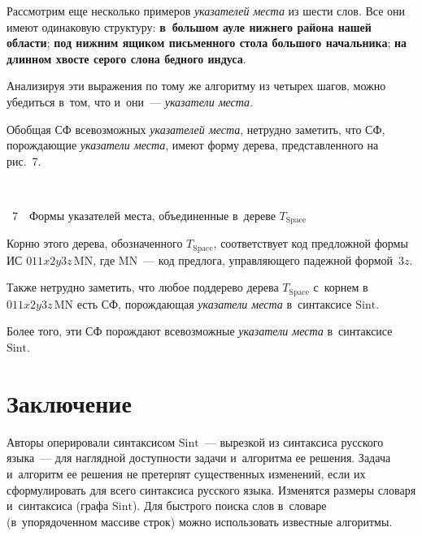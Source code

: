 \begin{multicols}{2}
     Рассмотрим еще несколько примеров \textit{указателей места} из шес\-ти 
слов. Все они имеют одинаковую структуру:
\textbf{в~большом ауле нижнего района нашей 
области}; \textbf{под нижним ящиком письменного стола
большого  начальника};
\textbf{на длинном хвосте серого слона бедного индуса}.

      

     
     Анализируя эти выражения по тому же алгоритму из четырех шагов, можно 
убедиться в~том, что и~они~--- \textit{указатели места}. 
     
     Обобщая СФ всевозможных \textit{указателей места}, нетрудно заметить, 
что СФ, по\-рож\-да\-ющие \textit{указатели места}, имеют форму дерева, 
пред\-став\-лен\-но\-го на рис.~7.

{ \begin{center}  %
 \vspace*{9pt}
  \mbox{%
 \epsfxsize=68.512mm 
 }


\end{center}


\noindent
{{\figurename~7}\ \ \small{Формы указателей места, объединенные в~дереве $T_{\mathrm{Space}}$}}
}
    
    \vspace*{12pt}

    
     
     Корню этого дерева, обозначенного $T_{\mathrm{Space}}$, соответствует код 
предложной формы ИС $011x2y3z\,\mathrm{MN}$, где $\mathrm{MN}$~--- код предлога, управ\-ля\-юще\-го 
падежной формой~$3z$.
     
     Также нетрудно заметить, что любое поддерево дерева $T_{\mathrm{Space}}$ с~корнем 
в~$011x2y3z\,\mathrm{MN}$ есть СФ, порождающая \textit{указатели места} в~синтаксисе 
$\mathrm{Sint}$. 
     
     Более того, эти СФ порождают все\-воз\-мож\-ные \textit{указатели места} 
в~синтаксисе $\mathrm{Sint}$. 
     
\section{Заключение}

Авторы оперировали синтаксисом $\mathrm{Sint}$~--- вырезкой из синтаксиса 
русского языка~--- для наглядной доступности задачи и~алгоритма ее решения. 
Задача и~алгоритм ее решения не претерпят существенных изменений, если их 
сформулировать для всего синтаксиса русского языка. Изменятся размеры 
словаря и~синтаксиса (графа $\mathrm{Sint}$). Для быстрого поиска слов в~словаре 
(в~упорядоченном массиве строк) можно использовать известные ал\-го\-ритмы.
     

\end{multicols}
